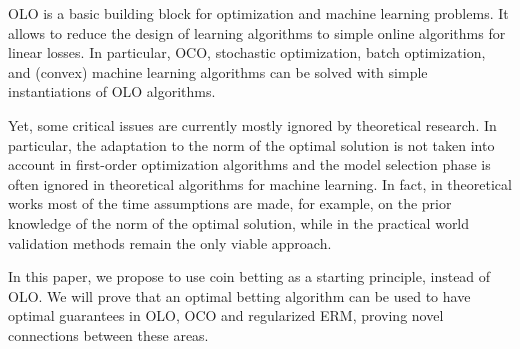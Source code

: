 \ac{OLO} is a basic building block for optimization and machine learning problems. It allows to reduce the design of learning algorithms to simple online algorithms for linear losses.
In particular, \ac{OCO}, stochastic optimization, batch optimization, and (convex) machine learning algorithms can be solved with simple instantiations of \ac{OLO} algorithms.

Yet, some critical issues are currently mostly ignored by theoretical research.
In particular, the adaptation to the norm of the optimal solution is not taken into account in first-order optimization algorithms and the model selection phase is often ignored in theoretical algorithms for machine learning.
In fact, in theoretical works most of the time assumptions are made, for example, on the prior knowledge of the norm of the optimal solution, while in the practical world validation methods remain the only viable approach.

In this paper, we propose to use coin betting as a starting principle, instead of \ac{OLO}. We will prove that an optimal betting algorithm can be used to have optimal guarantees in \ac{OLO}, \ac{OCO} and regularized ERM, proving novel connections between these areas.
